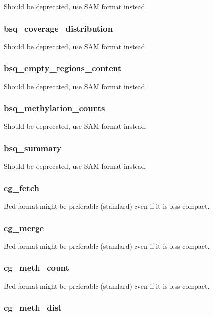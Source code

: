\documentclass[a4paper,12pt]{article}
\begin{document}
Should be deprecated, use SAM format instead.

\subsubsection{bsq\_coverage\_distribution}

Should be deprecated, use SAM format instead.

\subsubsection{bsq\_empty\_regions\_content}

Should be deprecated, use SAM format instead.

\subsubsection{bsq\_methylation\_counts}

Should be deprecated, use SAM format instead.

\subsubsection{bsq\_summary}

Should be deprecated, use SAM format instead.

\subsubsection{cg\_fetch}

Bed format might be preferable (standard) even if it is less compact.

\subsubsection{cg\_merge}

Bed format might be preferable (standard) even if it is less compact.

\subsubsection{cg\_meth\_count}

Bed format might be preferable (standard) even if it is less compact.

\subsubsection{cg\_meth\_dist}
\end{document}
